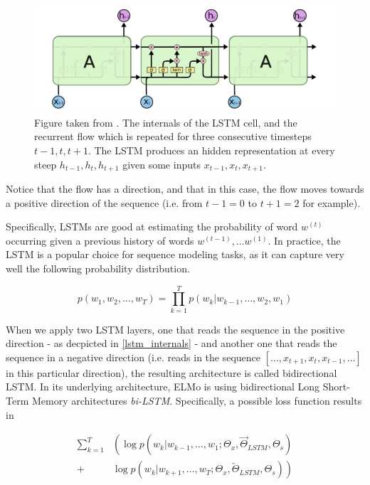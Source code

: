\documentclass[a4paper,12pt,twoside,openright]{report}
\begin{document}
\begin{figure}[h]
	\center
  \includegraphics[width=\linewidth]{./assets/background/LSTM.png}
  \caption{Figure taken from \cite{colahLSTM}. The internals of the LSTM cell, and the recurrent flow which is repeated for three consecutive timesteps $t-1, t, t+1$. 
  The LSTM produces an hidden representation at every steep $h_{t-1}, h_{t}, h_{t+1}$ given some inputs $x_{t-1}, x_t, x_{t+1}$.
  }
  \label{fig:lstm_internals}
\end{figure}

Notice that the flow has a direction, and that in this case, the flow moves towards a positive direction of the sequence (i.e. from $t-1 = 0$ to $t + 1 = 2$ for example).

Specifically, LSTMs \cite{hochreiter97} are good at estimating the probability of word $w^{(t)}$ occurring given a previous history of words $w^{(t-1)}, \ldots w^{(1)}$.
In practice, the LSTM is a popular choice for sequence modeling tasks, as it can capture very well the following probability distribution.

\begin{equation}
p\left(w_{1},  w_{2}, \ldots, w_{T} \right)=\prod_{k=1}^{T} p\left(w_{k} | w_{k-1}, \ldots, w_{2}, w_{1}\right)
\end{equation}

When we apply two LSTM layers, one that reads the sequence in the positive direction - as decpicted in \eqref{lstm_internals} - and another one that reads the sequence in a negative direction (i.e. reads in the sequence $[\ldots, x_{t+1}, x_t, x_{t-1}, \ldots]$ in this particular direction), the resulting architecture is called bidirectional LSTM.
In its underlying architecture, ELMo is using bidirectional Long Short-Term Memory architectures \textit{bi-LSTM}.
Specifically, a possible loss function results in 

\begin{align} 
\sum_{k=1}^{T} &\left(\log p\left(w_{k} | w_{k-1}, \ldots, w_{1} ; \Theta_{x}, \vec{\Theta}_{L S T M}, \Theta_{s}\right)\right.\\
+&\left.\log p\left(w_{k} | w_{k+1}, \ldots, w_{T}; \Theta_{x}, \overleftarrow{\Theta}_{L S T M}, \Theta_{s}\right)\right) 
\end{align}
\end{document}

